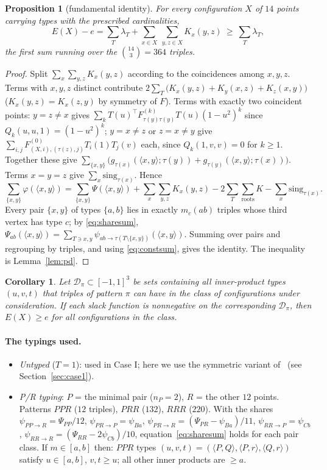 \documentclass[11pt]{article}
\newtheorem{proposition}[theorem]{Proposition}
\newtheorem{corollary}[theorem]{Corollary}
\theoremstyle{definition}
\newcommand{\ip}[2]{\langle #1,#2\rangle}
\begin{document}
\begin{proposition}[fundamental identity]\label{prop:identity}
For every configuration $X$ of $14$ points carrying types with the prescribed cardinalities,
\[
  E(X)-e=\sum_{T}\lambda_T+\sum_{x\in X}\ \sum_{y,z\in X}K_x(y,z)\ \ge\ \sum_T\lambda_T ,
\]
the first sum running over the $\binom{14}{3}=364$ triples.
\end{proposition}
\begin{proof}
Split $\sum_x\sum_{y,z}K_x(y,z)$ according to the coincidences among $x,y,z$. Terms with $x,y,z$ distinct contribute
$2\sum_T\big(K_x(y,z)+K_y(x,z)+K_z(x,y)\big)$ ($K_x(y,z)=K_x(z,y)$ by symmetry of $F$). Terms with exactly two coincident
points: $y=z\neq x$ gives $\sum_k T(u)^\top F^{(k)}_{\tau(y)\tau(y)}T(u)(1-u^2)^k$ since $Q_k(u,u,1)=(1-u^2)^k$;
$y=x\neq z$ or $z=x\neq y$ give $\sum_{i,j}F^{(0)}_{(X,i),(\tau(z),j)}T_i(1)T_j(v)$ each, since $Q_k(1,v,v)=0$ for $k\ge1$.
Together these give $\sum_{\{x,y\}}\big(g_{\tau(x)}(\ip xy;\tau(y))+g_{\tau(y)}(\ip xy;\tau(x))\big)$. Terms $x=y=z$ give
$\sum_x\mathrm{sing}_{\tau(x)}$. Hence
\[
 \sum_{\{x,y\}}\varphi(\ip xy)=\sum_{\{x,y\}}\Psi(\ip xy)+\sum_x\sum_{y,z}K_x(y,z)-2\sum_T\sum_{\text{roots}}K-\sum_x\mathrm{sing}_{\tau(x)} .
\]
Every pair $\{x,y\}$ of types $\{a,b\}$ lies in exactly $m_c(ab)$ triples whose third vertex has type $c$; by
\eqref{eq:sharesum}, $\Psi_{ab}(\ip xy)=\sum_{T\ni x,y}\psi_{ab\to\tau(T\setminus\{x,y\})}(\ip xy)$. Summing over pairs and
regrouping by triples, and using \eqref{eq:constsum}, gives the identity. The inequality is Lemma~\ref{lem:pd}.
\end{proof}

\begin{corollary}\label{cor:bound}
Let $\mathcal D_{\pi}\subset[-1,1]^3$ be sets containing all inner-product types $(u,v,t)$ that triples of pattern $\pi$
can have in the class of configurations under consideration. If each slack function is nonnegative on the corresponding
$\mathcal D_\pi$, then $E(X)\ge e$ for all configurations in the class.
\end{corollary}

\paragraph{The typings used.}
\begin{itemize}
\item \emph{Untyped} ($T=1$): used in Case I; here we use the symmetric variant of~\cite{CohnWoo} (see Section~\ref{sec:case1}).
\item \emph{P/R typing}: $P$ = the minimal pair ($n_P=2$), $R$ = the other $12$ points. Patterns $PPR$ ($12$ triples),
$PRR$ ($132$), $RRR$ ($220$). With the shares $\psi_{PP\to R}=\Psi_{PP}/12$,
$\psi_{PR\to P}=\psi_{Ba}$, $\psi_{PR\to R}=(\Psi_{PR}-\psi_{Ba})/11$, $\psi_{RR\to P}=\psi_{Cb}$,
$\psi_{RR\to R}=(\Psi_{RR}-2\psi_{Cb})/10$, equation~\eqref{eq:sharesum} holds for each pair class.
If $m\in[a,b]$ then: $PPR$ types $(u,v,t)=(\ip PQ,\ip Pr,\ip Qr)$ satisfy $u\in[a,b]$, $v,t\ge u$; all other inner
products are $\ge a$.
\end{itemize}
\end{document}
